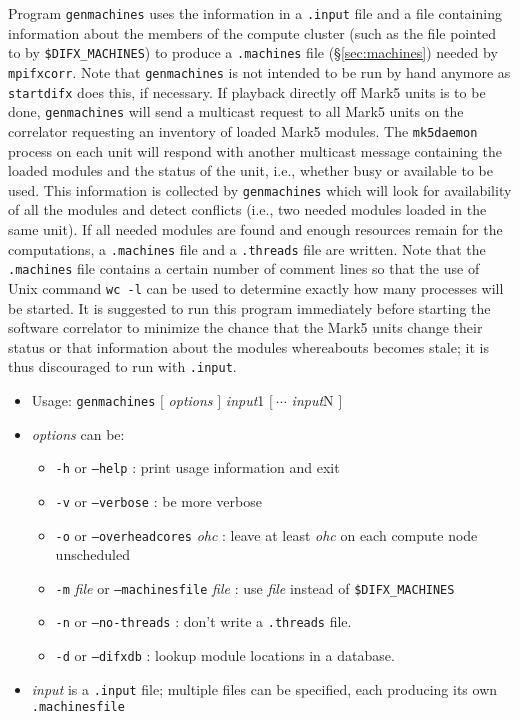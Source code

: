 Program {\tt genmachines} uses the information in a {\tt .input} file and a file containing information about the members of the compute cluster (such as the file pointed to by {\tt \$DIFX\_MACHINES}) to produce a {\tt .machines} file (\S\ref{sec:machines}) needed by {\tt mpifxcorr}.
Note that {\tt genmachines} is not intended to be run by hand anymore as {\tt startdifx} does this,
if necessary.
If playback directly off Mark5 units is to be done, {\tt genmachines} will send a multicast request to all Mark5 units on the correlator requesting an inventory of loaded Mark5 modules.
The {\tt mk5daemon} process on each unit will respond with another multicast message containing the loaded modules and the status of the unit, i.e., whether busy or available to be used.
This information is collected by {\tt genmachines} which will look for availability of all the modules and detect conflicts (i.e., two needed modules loaded in the same unit).
If all needed modules are found and enough resources remain for the computations, a {\tt .machines} file and a {\tt .threads} file are written.
Note that the {\tt .machines} file contains a certain number of comment lines so that the use of Unix command {\tt wc -l} can be used to determine exactly how many processes will be started.
It is suggested to run this program immediately before starting the software correlator to minimize the chance that the Mark5 units change their status or that information about the modules whereabouts becomes stale; it is thus discouraged to run with {\tt *.input}.

\begin{itemize}
\item[] Usage: {\tt genmachines} $[$ {\em options} $]$ {\em input}1 $[\ \cdots$ {\em input}N $]$
\item[] {\em options} can be:
\begin{itemize}
\item[] {\tt -h} or {\tt --help} : print usage information and exit
\item[] {\tt -v} or {\tt --verbose} : be more verbose
\item[] {\tt -o} or {\tt --overheadcores} {\em ohc} : leave at least {\em ohc} on each compute node unscheduled
\item[] {\tt -m} {\em file} or {\tt --machinesfile} {\em file} : use {\em file} instead of {\tt \$DIFX\_MACHINES}
\item[] {\tt -n} or {\tt --no-threads} : don't write a {\tt .threads} file.
\item[] {\tt -d} or {\tt --difxdb} : lookup module locations in a database.
\end{itemize}
\item[] {\em input} is a {\tt .input} file; multiple files can be specified, each producing its own {\tt .machinesfile}
\end{itemize}


